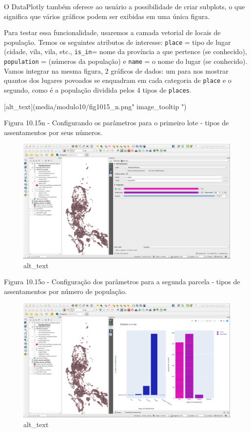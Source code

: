 \documentclass[
  portuguese,
]{krantz}
\begin{document}
O DataPlotly também oferece ao usuário a possibilidade de criar subplots, o que significa que vários gráficos podem ser exibidas em uma única figura.

Para testar essa funcionalidade, usaremos a camada vetorial de locais de população. Temos os seguintes atributos de interesse: \texttt{place} = tipo de lugar (cidade, vila, vila, etc., \texttt{is\_in}= nome da província a que pertence (se conhecido), \texttt{population} = (números da população) e \texttt{name} = o nome do lugar (se conhecido). Vamos integrar na mesma figura, 2 gráficos de dados: um para nos mostrar quantos dos lugares povoados se enquadram em cada categoria de \texttt{place} e o segundo, como é a população dividida pelos 4 tipos de \texttt{places}.

{[}alt\_text{]}(media/modulo10/fig1015\_n.png" image\_tooltip ")

Figura 10.15n - Configurando os parâmetros para o primeiro lote - tipos de assentamentos por seus números.

\begin{figure}
\centering
\includegraphics{media/modulo10/fig1015_o.png}
\caption{alt\_text}
\end{figure}

Figura 10.15o - Configuração dos parâmetros para a segunda parcela - tipos de assentamentos por número de população.

\begin{figure}
\centering
\includegraphics{media/modulo10/fig1015_p.png}
\caption{alt\_text}
\end{figure}
\end{document}
